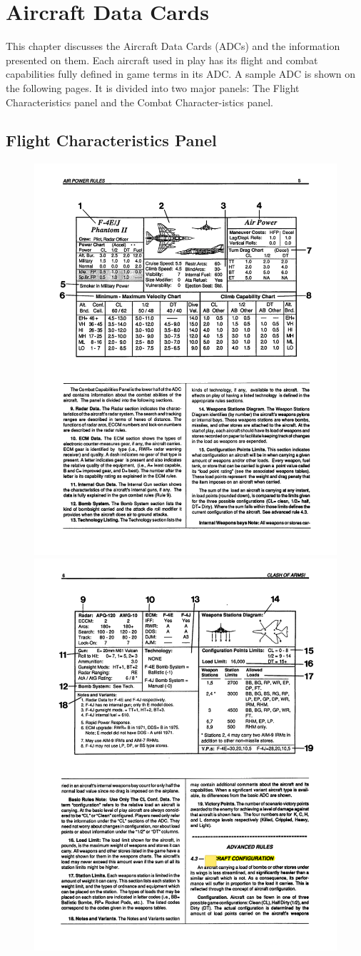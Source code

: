 \section{Aircraft Data Cards}

This chapter discusses the Aircraft Data Cards (ADCs) and the information presented on them. Each aircraft used in play has its flight and combat capabilities fully defined in game terms in its ADC. A sample ADC is shown on the following pages.  It is divided into two major panels: The Flight Characteristics panel and the Combat Character-istics panel.

\subsection{Flight Characteristics Panel}

\begin{figure}[!ht]
\centering
\includegraphics[width=0.7\linewidth]{figures/figure-E.pdf}
\includegraphics[width=0.7\linewidth]{figures/figure-F.pdf}
\end{figure}
    
